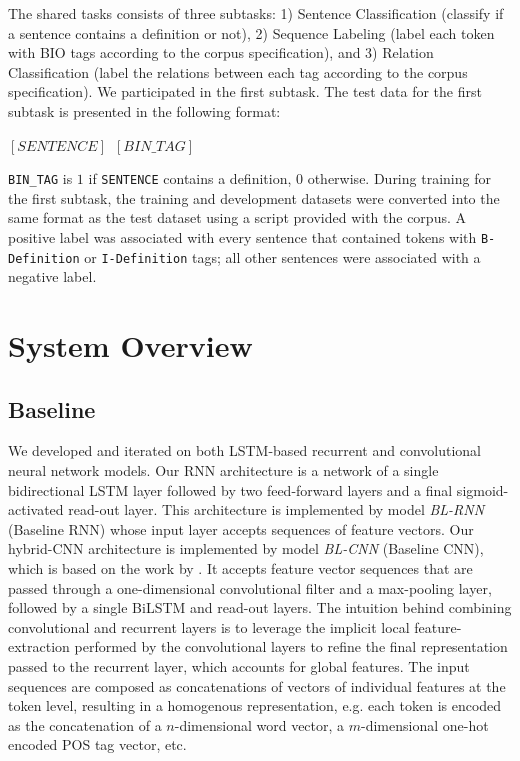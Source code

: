 \documentclass[11pt]{article}
\begin{document}
The shared tasks consists of three subtasks: 1) Sentence Classification (classify if a sentence contains a definition or not),
2) Sequence Labeling (label each token with BIO tags according to the corpus specification), and 3) Relation Classification
(label the relations between each tag according to the corpus specification). We participated in the first subtask. The test data
for the first subtask is presented in the following format:\\

\begin{small}
  \centerline{\texttt{$[SENTENCE]\hspace{6pt}[BIN\_TAG]$}}
\end{small}
\smallskip

{\small\texttt{BIN\_TAG}} is $1$ if {\small\texttt{SENTENCE}} contains a definition, $0$ otherwise. During training for the first subtask, the training and
development datasets were converted into the same format as the test dataset using a script provided with the corpus. A positive
label was associated with every sentence that contained tokens with {\small\texttt{B-Definition}} or {\small\texttt{I-Definition}} tags;
all other sentences were associated with a negative label.


\section{System Overview}
\subsection{Baseline}
We developed and iterated on both LSTM-based \cite{hochreiter1997long} recurrent and convolutional \cite{o2015introduction}
neural network models. Our RNN architecture is a network of a single bidirectional LSTM layer followed by two feed-forward layers and a final sigmoid-activated read-out layer. This architecture is implemented by model \emph{BL-RNN} (Baseline RNN)
whose input layer accepts sequences of feature vectors. Our hybrid-CNN architecture is implemented by model
\emph{BL-CNN} (Baseline CNN), which is based on the work by . It accepts feature vector
sequences that are passed through a one-dimensional convolutional filter and a max-pooling layer, followed by a single BiLSTM and read-out
layers. The intuition behind combining convolutional and recurrent layers is to leverage the implicit local feature-extraction performed by the convolutional layers to refine the final representation passed to the recurrent layer, which accounts for global features. The input sequences are composed as concatenations of vectors of individual features at the token level,
resulting in a homogenous representation, e.g. each token is encoded as the concatenation of a $n$-dimensional word vector,
a $m$-dimensional one-hot encoded POS tag vector, etc.\\
\end{document}
